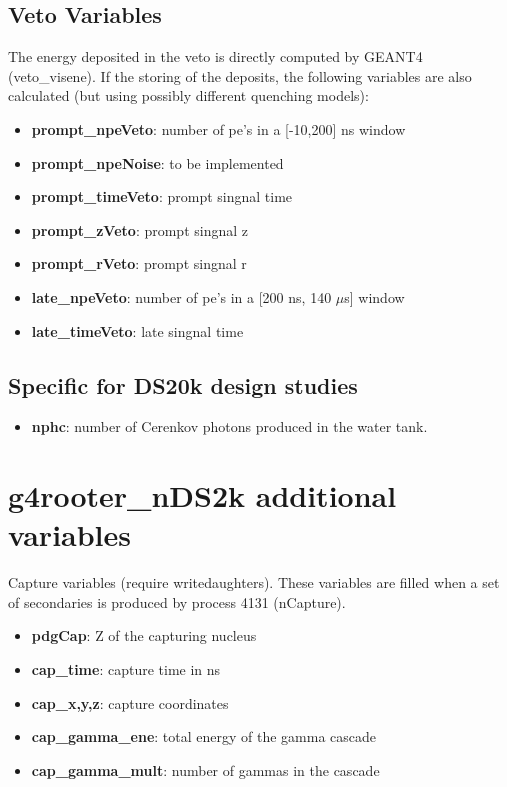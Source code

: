 \documentclass[twocolumn, 10pt]{article}
\begin{document}
\subsection{Veto Variables}

The energy deposited in the veto is directly computed by GEANT4 (veto\_visene). If the storing of the deposits, the following variables are also calculated (but using possibly different quenching models): 

\begin{itemize}
\item {\bf{prompt\_npeVeto}}:   number of pe's in a [-10,200] ns window
\item {\bf{prompt\_npeNoise}}:  to be implemented
\item {\bf{prompt\_timeVeto}}: prompt singnal time 
\item {\bf{prompt\_zVeto}}:    prompt singnal z
\item {\bf{prompt\_rVeto}}:    prompt singnal r
  
\item {\bf{late\_npeVeto}}:   number of pe's in a [200 ns, 140 $\mu$s] window
\item {\bf{late\_timeVeto}}:  late singnal time 
\end{itemize}


\subsection{Specific for DS20k design studies}
\begin{itemize}
\item {\bf{nphc}}: number of Cerenkov photons produced in the water tank. 
\end{itemize}




\section{g4rooter\_nDS2k additional variables}


Capture variables (require writedaughters). These variables are filled when a set of secondaries is produced by process 4131 (nCapture). 
\begin{itemize}
\item {\bf{pdgCap}}:  Z of the capturing nucleus 
\item {\bf{cap\_time}}: capture time in ns 
\item {\bf{cap\_x,y,z}}: capture coordinates
\item {\bf{cap\_gamma\_ene}}:    total energy of the gamma cascade
\item {\bf{cap\_gamma\_mult}}: number of gammas in the cascade
\end{itemize}
\end{document}
